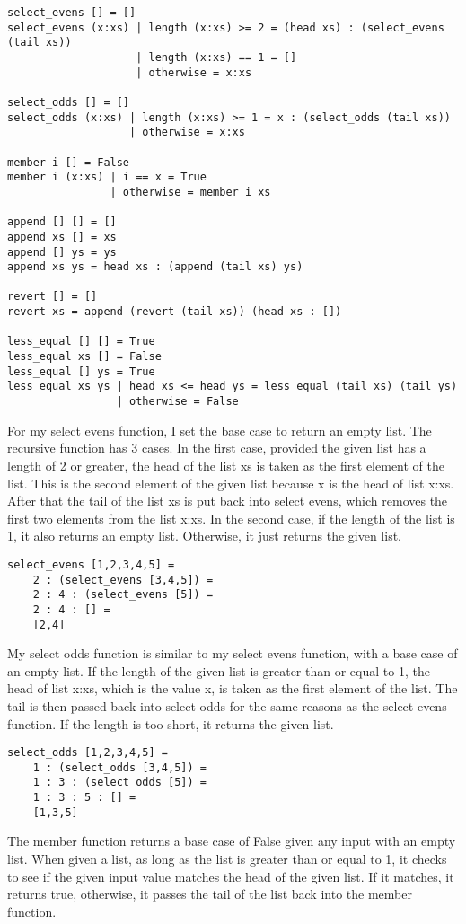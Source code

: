 \documentclass{article}
\theoremstyle{theorem}
\theoremstyle{definition}
\theoremstyle{remark}
\begin{document}
\begin{lstlisting}
select_evens [] = []
select_evens (x:xs) | length (x:xs) >= 2 = (head xs) : (select_evens (tail xs))
                    | length (x:xs) == 1 = []
                    | otherwise = x:xs

select_odds [] = []
select_odds (x:xs) | length (x:xs) >= 1 = x : (select_odds (tail xs))
                   | otherwise = x:xs

member i [] = False
member i (x:xs) | i == x = True
                | otherwise = member i xs

append [] [] = []
append xs [] = xs
append [] ys = ys
append xs ys = head xs : (append (tail xs) ys)

revert [] = []
revert xs = append (revert (tail xs)) (head xs : [])

less_equal [] [] = True
less_equal xs [] = False
less_equal [] ys = True
less_equal xs ys | head xs <= head ys = less_equal (tail xs) (tail ys)
                 | otherwise = False
\end{lstlisting}
%
For my select evens function, I set the base case to return an empty list. The recursive function has 3 cases. In the first case, provided the given list has a length of 2 or greater, the head of the list xs is taken as the first element of the list. This is the second element of the given list because x is the head of list x:xs. After that the tail of the list xs is put back into select evens, which removes the first two elements from the list x:xs. In the second case, if the length of the list is 1, it also returns an empty list. Otherwise, it just returns the given list.

\begin{lstlisting}
select_evens [1,2,3,4,5] =
	2 : (select_evens [3,4,5]) =
	2 : 4 : (select_evens [5]) =
	2 : 4 : [] =
	[2,4]
\end{lstlisting}
%
My select odds function is similar to my select evens function, with a base case of an empty list. If the length of the given list is greater than or equal to 1, the head of list x:xs, which is the value x, is taken as the first element of the list. The tail is then passed back into select odds for the same reasons as the select evens function. If the length is too short, it returns the given list.

\begin{lstlisting}
select_odds [1,2,3,4,5] =
	1 : (select_odds [3,4,5]) =
	1 : 3 : (select_odds [5]) =
	1 : 3 : 5 : [] =
	[1,3,5]
\end{lstlisting}
%
The member function returns a base case of False given any input with an empty list. When given a list, as long as the list is greater than or equal to 1, it checks to see if the given input value matches the head of the given list. If it matches, it returns true, otherwise, it passes the tail of the list back into the member function.
\end{document}
